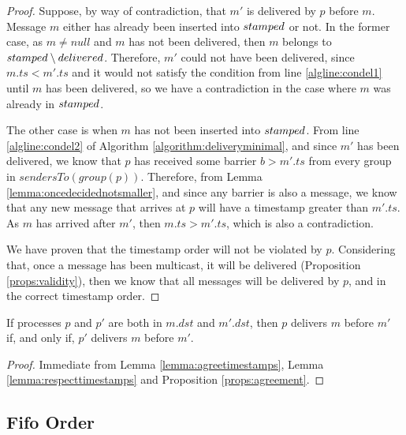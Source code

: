 \documentclass[times, 10pt]{article}
\begin{document}
\begin{proof}
Suppose, by way of contradiction, that $m'$ is delivered by $p$ before $m$. Message $m$ either has already been inserted into $stamped$ or not. In the former case, as $m \neq null$ and $m$ has not been delivered, then $m$ belongs to $stamped \setminus delivered$. Therefore, $m'$ could not have been delivered, since $m.ts < m'.ts$ and it would not satisfy the condition from line \ref{algline:condel1} until $m$ has been delivered, so we have a contradiction in the case where $m$ was already in $stamped$.

The other case is when $m$ has not been inserted into $stamped$. From line \ref{algline:condel2} of Algorithm \ref{algorithm:deliveryminimal}, and since $m'$ has been delivered, we know that $p$ has received some barrier $b > m'.ts$ from every group in $sendersTo(group(p))$. Therefore, from Lemma \ref{lemma:oncedecidednotsmaller}, and since any barrier is also a message, we know that any new message that arrives at $p$ will have a timestamp greater than $m'.ts$. As $m$ has arrived after $m'$, then $m.ts > m'.ts$, which is also a contradiction.

We have proven that the timestamp order will not be violated by $p$. Considering that, once a message has been multicast, it will be delivered (Proposition \ref{props:validity}), then we know that all messages will be delivered by $p$, and in the correct timestamp order.\end{proof}




\begin{props} \label{props:atomicorder}
If processes $p$ and $p'$ are both in $m.dst$ and $m'.dst$, then $p$ delivers $m$ before $m'$ if, and only if, $p'$ delivers $m$ before $m'$.
\end{props}

\begin{proof}
Immediate from Lemma \ref{lemma:agreetimestamps}, Lemma \ref{lemma:respecttimestamps} and Proposition \ref{props:agreement}.
\end{proof}



\subsection{Fifo Order}
\end{document}
